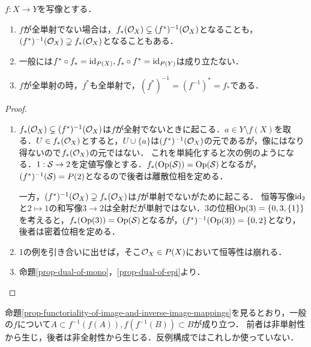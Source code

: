 \documentclass[uplatex,dvipdfmx]{jsreport}
\begin{document}
\begin{lemma}[押し出しが像位相になるとき]
    $f:X\to Y$を写像とする．
    \begin{enumerate}
        \item $f$が全単射でない場合は，$f_*(\O_X)\subsetneq (f^*)^{-1}(\O_X)$となることも，$(f^*)^{-1}(\O_X)\supsetneq f_*(\O_X)$となることもある．
        \item 一般には$f^*\circ f_*=\id_{P(X)},f_*\circ f^*=\id_{P(Y)}$は成り立たない．
        \item $f$が全単射の時，$f^*$も全単射で，$(f^*)^{-1}=(f^{-1})^*=f_*$である．
    \end{enumerate}
\end{lemma}
\begin{proof}\mbox{}
    \begin{enumerate}
        \item $f_*(\O_X)\subsetneq (f^*)^{-1}(\O_X)$は$f$が全射でないときに起こる．$a\in Y\setminus f(X)$を取る．$U\in f_*(\O_X)$とすると，$U\cup\{a\}$は$(f^*)^{-1}(\O_X)$の元であるが，像にはなり得ないので$f_*(\O_X)$の元ではない．
        これを単純化すると次の例のようになる．$1:\S\to 2$を定値写像とする．$f_*(\Op(\S))=\Op(\S)$となるが，$(f^*)^{-1}(\S)=P(2)$となるので後者は離散位相を定める．

        一方，$(f^*)^{-1}(\O_X)\supsetneq f_*(\O_X)$は$f$が単射でないがために起こる．
        恒等写像$\id_2$と$2\mapsto 1$の和写像$3\to 2$は全射だが単射ではない．$3$の位相$\Op(3)=\{0,3,\{1\}\}$を考えると，$f_*(\Op(3))=\Op(\S)$となるが，$(f^*)^{-1}(\Op(3))=\{0,2\}$となり，後者は密着位相を定める．
        \item 1の例を引き合いに出せば，そこ$\O_X\in P(X)$において恒等性は崩れる．
        \item 命題\ref{prop-dual-of-mono}，\ref{prop-dual-of-epi}より．
    \end{enumerate}
\end{proof}
\begin{remarks}
    命題\ref{prop-functoriality-of-image-and-inverse-image-mappings}を見るとおり，一般の$f$について$A\subset f^{-1}(f(A)),f(f^{-1}(B))\subset B$が成り立つ．
    前者は非単射性から生じ，後者は非全射性から生じる．反例構成ではこれしか使っていない．
\end{remarks}
\end{document}
